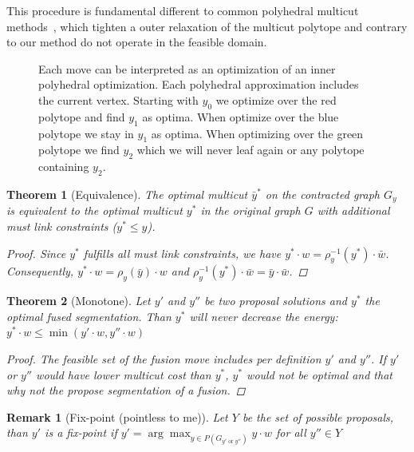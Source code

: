 \documentclass[10pt,twocolumn,letterpaper]{article}
\newtheorem{theorem}{Theorem}
\newtheorem{remark}{Remark}
\newcommand{\OR}{\textrm{ or }}
\begin{document}
This procedure is fundamental different to common polyhedral multicut methods~\cite{kappes_2011_emmcvpr,kappes_2013_arxiv}, 
which tighten a outer relaxation of the multicut polytope and contrary to our method do not operate in the feasible domain. 



\begin{figure}
\centering

\caption{Each move can be interpreted as an optimization of an inner polyhedral optimization.
Each polyhedral approximation includes the current vertex. Starting with $y_0$ we optimize over the red polytope 
and find $y_1$ as optima. When optimize over the blue polytope we stay in $y_1$ as optima.
When optimizing over the green polytope we find $y_2$ which we will never leaf again or any polytope containing $y_2$. 
}
\label{fig:polyheadral}
\end{figure}


\begin{theorem}[Equivalence]
The optimal multicut $\bar{y}^*$ on the contracted graph $G_y$
is equivalent to the optimal multicut $y^*$ in the original graph $G$ 
with additional must link constraints ($y^* \leq y$).
%
\begin{proof}
Since $y^*$ fulfills all  must link constraints, we have  $y^*\cdot w = \rho^{-1}_y(y^*)\cdot \bar{w}$.
Consequently, $y^*\cdot w = \rho_y(\bar{y}) \cdot w$ and  $\rho^{-1}_y(y^*)\cdot \bar{w}= \bar{y}\cdot\bar{w}$.
\end{proof}
%
\end{theorem}




\begin{theorem}[Monotone]
Let $y'$ and $y''$ be two proposal solutions and  $y^*$ the optimal fused segmentation.
Than $y^*$  will never decrease the energy:
$y^* \cdot w \leq  \min( y'\cdot w,  y''\cdot w) $ 
%
\begin{proof}
The feasible set of the fusion move includes per definition  $y'$ and $y''$.
If $y'$ or $y''$ would have lower multicut cost than $y^*$, $y^*$ would not be optimal 
and that why not the propose segmentation of a fusion.
\end{proof}
%
\end{theorem}


\begin{remark}[Fix-point (pointless to me)]
Let $Y$ be the set of possible proposals, than
$y'$ is a fix-point if $y'=\arg\max_{y\in P(G_{y'\OR y''})} y\cdot w$ for all $y''\in Y$
\end{remark}
\end{document}

